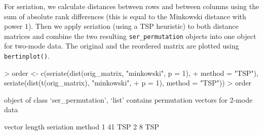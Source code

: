 \documentclass[fleqn, a4paper]{article}
\newcommand{\func}[1]{\mbox{\texttt{#1()}}}
\newcommand{\code}[1]{\mbox{\texttt{#1}}}
\begin{document}
For seriation, we calculate distances between rows and between columns using
the sum of absolute rank differences (this is equal to the Minkowski distance
with power $1$). Then we apply seriation (using a TSP heuristic) to both
distance matrices and combine the two resulting \code{ser\_permutation} objects
into one object for two-mode data. The original and the reordered matrix are
plotted using \func{bertinplot}. 

\begin{Schunk}
\begin{Sinput}
> order <- c(seriate(dist(orig_matrix, "minkowski", p = 1), 
+     method = "TSP"), seriate(dist(t(orig_matrix), "minkowski", 
+     p = 1), method = "TSP"))
> order
\end{Sinput}
\begin{Soutput}
object of class ‘ser_permutation’, ‘list’
contains permutation vectors for 2-mode data

  vector length seriation method
1            41              TSP
2             8              TSP
\end{Soutput}
\end{Schunk}
\end{document}
